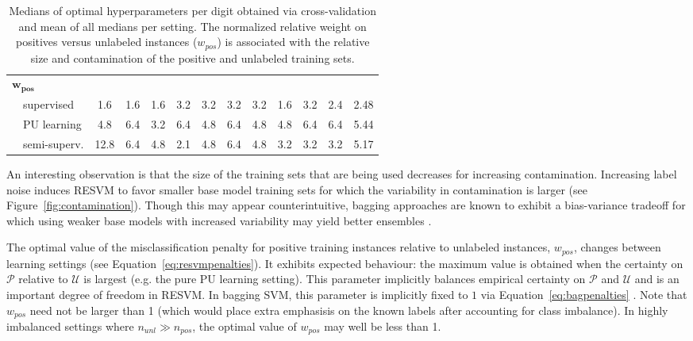 \documentclass[preprint,elsarticle-num,12pt]{elsarticle}
\begin{document}
\begin{table}[!h]
\begin{tabular}{lccccccccccc}
$\mathbf{w_{pos}}$ \\
\ \ supervised  &  1.6 &  1.6 &  1.6 &  3.2 &  3.2 &  3.2 &  3.2 &  1.6 &  3.2 &  2.4 &  2.48 \\
\ \ PU learning &  4.8 &  6.4 &  3.2 &  6.4 &  4.8 &  6.4 &  4.8 &  4.8 &  6.4 &  6.4 &  5.44 \\
\ \ semi-superv.  & 12.8 &  6.4 &  4.8 &  2.1 &  4.8 &  6.4 &  4.8 &  3.2 &  3.2 &  3.2 &  5.17 \\
\bottomrule
\end{tabular}
\caption{Medians of optimal hyperparameters per digit obtained via cross-validation and mean of all medians per setting. The normalized relative weight on positives versus unlabeled instances ($w_{pos}$) is associated with the relative size and contamination of the positive and unlabeled training sets.}
\label{table:hyperparameters}
\end{table}

An interesting observation is that the size of the training sets that are being used decreases for increasing contamination. Increasing label noise induces RESVM to favor smaller base model training sets for which the variability in contamination is larger (see Figure~\ref{fig:contamination}). Though this may appear counterintuitive, bagging approaches are known to exhibit a bias-variance tradeoff \citep{bauer1999empirical} for which using weaker base models with increased variability may yield better ensembles \citep{biasvariance}.

The optimal value of the misclassification penalty for positive training instances relative to unlabeled instances, $w_{pos}$, changes between learning settings (see Equation~\eqref{eq:resvmpenalties}). It exhibits expected behaviour: the maximum value is obtained when the certainty on $\mathcal{P}$ relative to $\mathcal{U}$ is largest (e.g. the pure PU learning setting). This parameter implicitly balances empirical certainty on $\mathcal{P}$ and $\mathcal{U}$ and is an important degree of freedom in RESVM. In bagging SVM, this parameter is implicitly fixed to $1$ via Equation~\eqref{eq:bagpenalties} \citep{mordelet2014bagging}. Note that $w_{pos}$ need not be larger than 1 (which would place extra emphasisis on the known labels after accounting for class imbalance). In highly imbalanced settings where $n_{unl} \gg n_{pos}$, the optimal value of $w_{pos}$ may well be less than 1.
\end{document}

